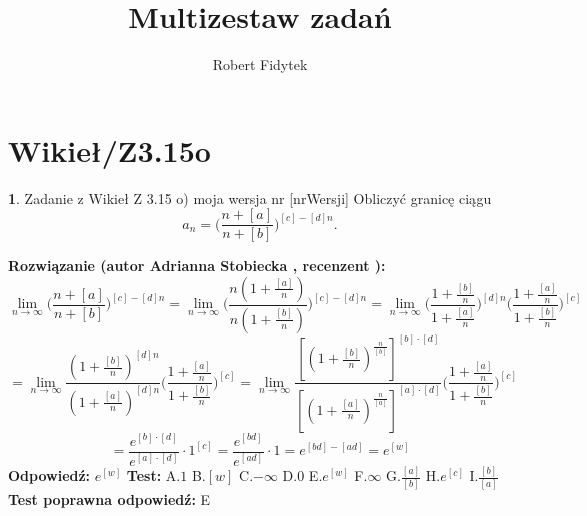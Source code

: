 \documentclass[12pt, a4paper]{article}
\title{Multizestaw zadań}
\author{Robert Fidytek}
\date{}
\theoremstyle{definition} %
\newtheorem{zad}{}
\newcommand{\kategoria}[1]{\section{#1}} %
\newcommand{\zadStart}[1]{\begin{zad}#1\newline} %
\newcommand{\zadStop}{\end{zad}}   %
\newcommand{\rozwStart}[2]{\noindent \textbf{Rozwiązanie (autor #1 , recenzent #2): }\newline} %
\newcommand{\rozwStop}{\newline}                                            %
\newcommand{\odpStart}{\noindent \textbf{Odpowiedź:}\newline}    %
\newcommand{\odpStop}{\newline}                                             %
\newcommand{\testStart}{\noindent \textbf{Test:}\newline} %
\newcommand{\testStop}{\newline} %
\newcommand{\kluczStart}{\noindent \textbf{Test poprawna odpowiedź:}\newline} %
\newcommand{\kluczStop}{\newline} %
\begin{document}
\maketitle


\kategoria{Wikieł/Z3.15o}
\zadStart{Zadanie z Wikieł Z 3.15 o) moja wersja nr [nrWersji]}
Obliczyć granicę ciągu 
$$a_n=\bigg(\frac{n+[a]}{n+[b]}\bigg)^{[c]-[d]n}.$$
\zadStop
\rozwStart{Adrianna Stobiecka}{}
$$\lim_{n\to\infty}\bigg(\frac{n+[a]}{n+[b]}\bigg)^{[c]-[d]n}=\lim_{n\to\infty}\bigg(\frac{n(1+\frac{[a]}{n})}{n(1+\frac{[b]}{n})}\bigg)^{[c]-[d]n}=\lim_{n\to\infty}\bigg(\frac{1+\frac{[b]}{n}}{1+\frac{[a]}{n}}\bigg)^{[d]n}\bigg(\frac{1+\frac{[a]}{n}}{1+\frac{[b]}{n}}\bigg)^{[c]}$$
$$=\lim_{n\to\infty}\frac{(1+\frac{[b]}{n})^{[d]n}}{(1+\frac{[a]}{n})^{[d]n}}\bigg(\frac{1+\frac{[a]}{n}}{1+\frac{[b]}{n}}\bigg)^{[c]}=\lim_{n\to\infty}\frac{[(1+\frac{[b]}{n})^{\frac{n}{[b]}}]^{[b]\cdot[d]}}{[(1+\frac{[a]}{n})^{\frac{n}{[a]}}]^{[a]\cdot[d]}}\bigg(\frac{1+\frac{[a]}{n}}{1+\frac{[b]}{n}}\bigg)^{[c]}$$
$$=\frac{e^{[b]\cdot[d]}}{e^{[a]\cdot[d]}}\cdot1^{[c]}=\frac{e^{[bd]}}{e^{[ad]}}\cdot1=e^{[bd]-[ad]}=e^{[w]}$$
\rozwStop
\odpStart
 $e^{[w]}$
\odpStop
\testStart
A.$1$
B.$[w]$
C.$-\infty$
D.$0$
E.$e^{[w]}$
F.$\infty$
G.$\frac{[a]}{[b]}$
H.$e^{[c]}$
I.$\frac{[b]}{[a]}$
\testStop
\kluczStart
E
\kluczStop
\end{document}
